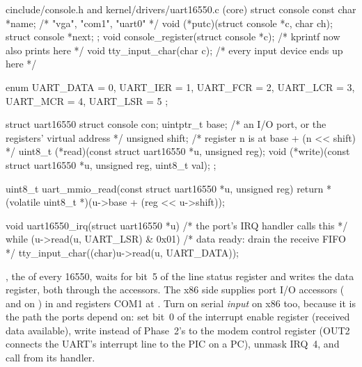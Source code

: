 \documentclass[11pt,a4paper]{article}
\begin{document}
\begin{lst}{c}{include/console.h and kernel/drivers/uart16550.c (core)}
struct console {
    const char     *name;                        /* "vga", "com1", "uart0"          */
    void          (*putc)(struct console *c, char ch);
    struct console *next;
};
void console_register(struct console *c);        /* kprintf now also prints here    */
void tty_input_char(char c);                     /* every input device ends up here */

enum { UART_DATA = 0, UART_IER = 1, UART_FCR = 2, UART_LCR = 3, UART_MCR = 4, UART_LSR = 5 };

struct uart16550 {
    struct console con;
    uintptr_t      base;               /* an I/O port, or the registers' virtual address */
    unsigned       shift;              /* register n is at base + (n << shift)           */
    uint8_t      (*read)(const struct uart16550 *u, unsigned reg);
    void         (*write)(const struct uart16550 *u, unsigned reg, uint8_t val);
};

uint8_t uart_mmio_read(const struct uart16550 *u, unsigned reg)
{
    return *(volatile uint8_t *)(u->base + (reg << u->shift));
}

void uart16550_irq(struct uart16550 *u)          /* the port's IRQ handler calls this  */
{
    while (u->read(u, UART_LSR) & 0x01)          /* data ready: drain the receive FIFO */
        tty_input_char((char)u->read(u, UART_DATA));
}
\end{lst}

, the  of every 16550, waits for bit~5 of the line status register and writes the data
register, both through the accessors. The x86 side supplies port I/O accessors ( and  on
) in  and registers COM1 at . Turn on serial
\emph{input} on x86 too, because it is the path the ports depend on: set bit~0 of the interrupt enable register
(received data available), write  instead of Phase~2's  to the modem control register (OUT2
connects the UART's interrupt line to the PIC on a PC), unmask IRQ~4, and call  from its handler.
\end{document}
